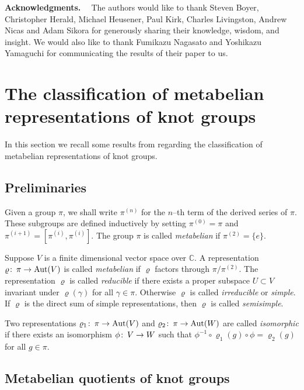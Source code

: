\documentclass[12pt]{amsart}
\theoremstyle{plain}
\theoremstyle{remark}
\begin{document}
\bigskip \noindent
{\bf Acknowledgments. \ } The authors would like to thank
Steven Boyer, Christopher Herald, Michael Heusener, Paul Kirk, Charles Livingston, Andrew Nicas and Adam Sikora for
generously sharing their knowledge, wisdom, and insight.
We would also like to thank Fumikazu Nagasato and Yoshikazu Yamaguchi for communicating
the results of their paper to us.

\section{The classification of metabelian representations of knot groups}

In this section we recall some results from \cite{BF08}
regarding the classification of metabelian  representations of knot groups.

\subsection{Preliminaries}
Given a group $\pi$, we shall write  $\pi^{(n)}$ for the $n$--th term of the
derived series of $\pi$. These subgroups are defined inductively by setting
$\pi^{(0)}=\pi$ and $\pi^{(i+1)}=[\pi^{(i)},\pi^{(i)}]$.
The group $\pi$ is called \emph{metabelian} if $\pi^{(2)}=\{e\}$.

Suppose $V$ is a finite dimensional vector space over ${{\mathbb C}}$.
A  representation $\varrho {\colon\thinspace} \pi\to {\operatorname{Aut}}(V)$
is called \emph{metabelian}
 if $\varrho$ factors through $\pi/\pi^{(2)}$. The representation $\varrho$ is
 called \emph{reducible}
if there exists a proper subspace $U\subset V$ invariant under $\varrho({\gamma})$ for all ${\gamma}\in  \pi.$
Otherwise $\varrho$ is called \emph{irreducible} or \emph{simple}.
If $\varrho$ is the direct sum of simple representations, then $\varrho$ is called \emph{semisimple}.

Two representations
$\varrho_1 {\colon\thinspace} \pi \to {\operatorname{Aut}}(V)$ and $\varrho_2 {\colon\thinspace} \pi \to {\operatorname{Aut}}(W)$ are called \emph{isomorphic}
if there exists an isomorphism $\phi {\colon\thinspace} V\to W$ such that $\phi^{-1} \circ \varrho_1(g)\circ \phi=\varrho_2(g)$ for all $g\in \pi$.

\subsection{Metabelian quotients of knot groups}\label{section:metabk}
\end{document}
